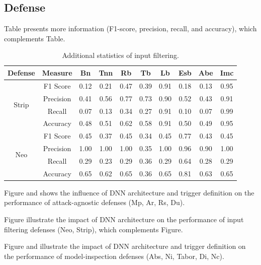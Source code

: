\documentclass[compsoc,conference,a4paper,10pt,times]{IEEEtran}
\newcommand{\bn}{{\sc Bn}\xspace}
\newcommand{\tnn}{{\sc Tnn}\xspace}
\newcommand{\tb}{{\sc Tb}\xspace}
\newcommand{\lb}{{\sc Lb}\xspace}
\newcommand{\esb}{{\sc Esb}\xspace}
\newcommand{\rfb}{{\sc Rb}\xspace}
\newcommand{\abe}{{\sc Abe}\xspace}
\newcommand{\imc}{{\sc Imc}\xspace}
\newcommand{\nc}{{\sc Nc}\xspace}
\newcommand{\ninspect}{{\sc Ni}\xspace}
\newcommand{\du}{{\sc Du}\xspace}
\newcommand{\abs}{{\sc Abs}\xspace}
\newcommand{\tabor}{{\sc Tabor}\xspace}
\newcommand{\strip}{{\sc Strip}\xspace}
\newcommand{\di}{{\sc Di}\xspace}
\newcommand{\at}{{\sc Ar}\xspace}
\newcommand{\rands}{{\sc Rs}\xspace}
\newcommand{\neo}{{\sc Neo}\xspace}
\newcommand{\mmp}{{\sc Mp}\xspace}
\begin{document}
\subsection{Defense}

Table presents more information (F1-score, precision, recall, and accuracy), which complements Table.

\begin{table}[!ht]{\footnotesize
    \centering
    \renewcommand{\arraystretch}{1.2}
    \setlength{\tabcolsep}{3pt}
    \begin{tabular}{c|c|c|c|c|c|c|c|c|c}
  {\bf Defense}  & {\bf Measure} & \bn & \tnn & \rfb & \tb & \lb & \esb & \abe & \imc \\
    \hline
    \multirow{4}{*}{\strip} & F1 Score & 0.12 & 0.21 & 0.47 & 0.39 & \cellcolor{Red} 0.91 & 0.18 & 0.13 & \cellcolor{Red} 0.95 \\
    & Precision & 0.41 & 0.56 & 0.77 & 0.73 & 0.90 & 0.52 & 0.43 & 0.91 \\
    & Recall & 0.07 & 0.13 & 0.34 & 0.27 & 0.91 & 0.10 & 0.07 & 0.99 \\
    & Accuracy & 0.48 & 0.51 & 0.62 & 0.58 & 0.91 & 0.50 & 0.49 & 0.95 \\
    \hline
    \multirow{4}{*}{\neo} & F1 Score & 0.45 & 0.37 & 0.45 & 0.34 & 0.45 & \cellcolor{Red}0.77 & 0.43 & 0.45 \\
    & Precision & 1.00 & 1.00 & 1.00 & 0.35 & 1.00 & 0.96 & 0.90 & 1.00 \\
    & Recall & 0.29 & 0.23 & 0.29 & 0.36 & 0.29 & 0.64 & 0.28 & 0.29 \\
    & Accuracy & 0.65 & 0.62 & 0.65 & 0.36 & 0.65 & 0.81 & 0.63 & 0.65 \\
    \hline
    \end{tabular}
    \caption{Additional statistics of input filtering. \label{tab:input-filtering2}}}
\end{table}


Figure and shows the influence of DNN architecture and  trigger definition on the performance of attack-agnostic defenses (\mmp, \at, \rands, \du).



Figure illustrate the impact of DNN architecture on the performance of input filtering defenses (\neo, \strip), which complements Figure.

Figure and illustrate the impact of DNN architecture and  trigger definition on the performance of model-inspection defenses (\abs, \ninspect, \tabor, \di, \nc).
\end{document}
